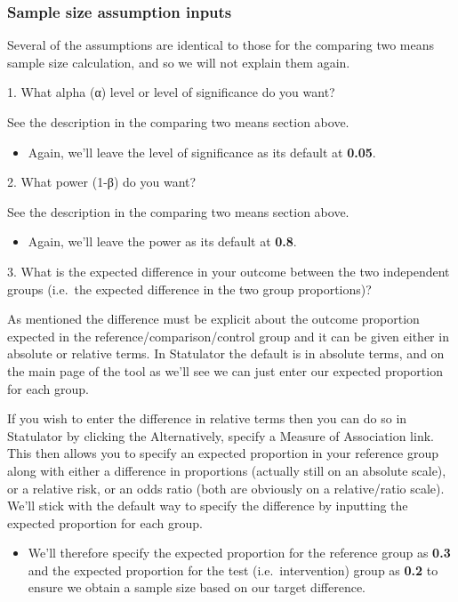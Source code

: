 \documentclass[
]{book}
\providecommand{\tightlist}{%
  \setlength{\itemsep}{0pt}\setlength{\parskip}{0pt}}
\begin{document}
\hypertarget{sample-size-assumption-inputs-3}{%
\subsubsection{Sample size assumption inputs}\label{sample-size-assumption-inputs-3}}

Several of the assumptions are identical to those for the comparing two means sample size calculation, and so we will not explain them again.

1. What alpha (α) level or level of significance do you want?

See the description in the comparing two means section above.

\begin{itemize}
\tightlist
\item
  Again, we'll leave the level of significance as its default at \textbf{0.05}.
\end{itemize}

2. What power (1-β) do you want?

See the description in the comparing two means section above.

\begin{itemize}
\tightlist
\item
  Again, we'll leave the power as its default at \textbf{0.8}.
\end{itemize}

3. What is the expected difference in your outcome between the two independent groups (i.e.~the expected difference in the two group proportions)?

As mentioned the difference must be explicit about the outcome proportion expected in the reference/comparison/control group and it can be given either in absolute or relative terms. In Statulator the default is in absolute terms, and on the main page of the tool as we'll see we can just enter our expected proportion for each group.

If you wish to enter the difference in relative terms then you can do so in Statulator by clicking the Alternatively, specify a Measure of Association link. This then allows you to specify an expected proportion in your reference group along with either a difference in proportions (actually still on an absolute scale), or a relative risk, or an odds ratio (both are obviously on a relative/ratio scale). We'll stick with the default way to specify the difference by inputting the expected proportion for each group.

\begin{itemize}
\tightlist
\item
  We'll therefore specify the expected proportion for the reference group as \textbf{0.3} and the expected proportion for the test (i.e.~intervention) group as \textbf{0.2} to ensure we obtain a sample size based on our target difference.
\end{itemize}
\end{document}
